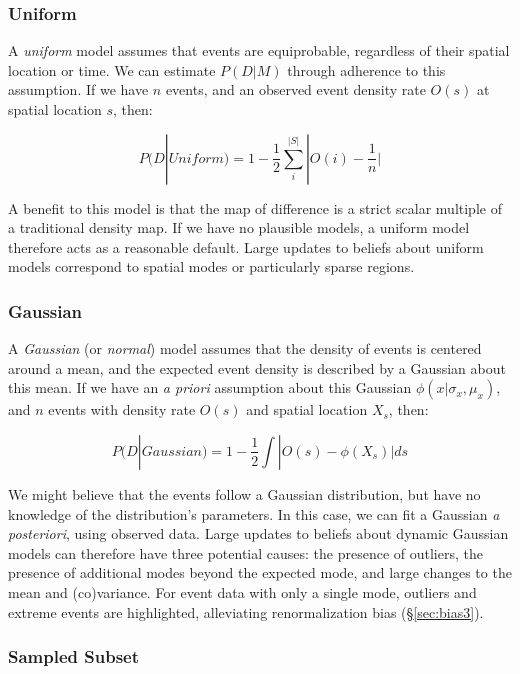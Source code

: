 \documentclass[journal]{vgtc}                %
\begin{document}
\subsubsection{Uniform}

A \emph{uniform} model assumes that events are equiprobable, regardless of their spatial location or time. We can estimate $P(D|M)$ through adherence to this assumption. If we have $n$ events, and an observed event density rate $O(s)$ at spatial location $s$, then:

$$P(D|Uniform) =  1- \frac{1}{2}\sum_{i}^{|S|}| O(i) - \frac{1}{n} |$$

A benefit to this model is that the map of difference is a strict scalar multiple of a traditional density map. If we have no plausible models, a uniform model therefore acts as a reasonable default. Large updates to beliefs about uniform models correspond to spatial modes or particularly sparse regions.


\subsubsection{Gaussian}

A \emph{Gaussian} (or \emph{normal}) model assumes that the density of events is centered around a mean, and the expected event density is described by a Gaussian about this mean. If we have an \emph{a priori} assumption about this Gaussian $\phi(x|\sigma_{x},\mu_{x})$, and $n$ events with density rate $O(s)$ and spatial location $X_s$, then:

$$P(D|Gaussian) = 1-\frac{1}{2}\int | O(s) - \phi(X_s) |ds$$

We might believe that the events follow a Gaussian distribution, but have no knowledge of the distribution's parameters. In this case, we can fit a Gaussian \emph{a posteriori}, using observed data. Large updates to beliefs about dynamic Gaussian models can therefore have three potential causes: the presence of outliers, the presence of additional modes beyond the expected mode, and large changes to the mean and (co)variance. For event data with only a single mode, outliers and extreme events are highlighted, alleviating renormalization bias (\S\ref{sec:bias3}).

\subsubsection{Sampled Subset}
\end{document}
